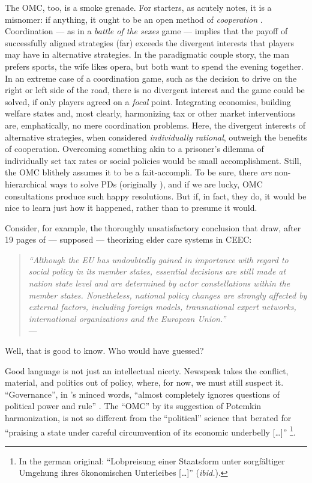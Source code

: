 \documentclass[11pt,a4paper,oneside]{article}
\begin{document}
The \gls{OMC}, too, is a smoke grenade. 
For starters, as \citeauthor{Offe2003} acutely notes, it is a misnomer: 
if anything, it ought to be an open method of \emph{cooperation} \citeyearpar[467]{Offe2003}. 
Coordination --- as in a \emph{battle of the sexes} game --- implies that the payoff of successfully aligned strategies (far) exceeds the divergent interests that players may have in alternative strategies. 
In the paradigmatic couple story, the man prefers sports, the wife likes opera, but both want to spend the evening together. 
In an extreme case of a coordination game, such as the decision to drive on the right or left side of the road, there is no divergent interest and the game could be solved, if only players agreed on a \emph{focal} point. 
Integrating economies, building welfare states and, most clearly, harmonizing tax or other market interventions are, emphatically, no mere coordination problems. 
Here, the divergent interests of alternative strategies, when considered \emph{individually rational}, outweigh the benefits of cooperation. 
Overcoming something akin to a prisoner's dilemma of individually set tax rates or social policies would be small accomplishment. 
Still, the \gls{OMC} blithely assumes it to be a fait-accompli. 
To be sure, there \emph{are} non-hierarchical ways to solve \glspl{PD} (originally \citealt{Axelrod1980}), and if we are lucky, \gls{OMC} consultations produce such happy resolutions. 
But if, in fact, they do, it would be nice to learn just how it happened, rather than to presume it would. 

Consider, for example, the thoroughly unsatisfactory conclusion that \citeauthor{Theobald2009} draw, after 19 pages of --- supposed --- theorizing elder care systems in \gls{CEEC}:
\begin{quote}
	\emph{``Although the EU has undoubtedly gained in importance with regard to social policy in its member states, essential decisions are still made at nation state level and are determined by actor constellations within the member states.
	Nonetheless, national policy changes are strongly affected by external factors, including foreign models, transnational expert networks, international organizations and the European Union.''}\\
	--- \citet[163]{Theobald2009}
\end{quote}
Well, that is good to know. 
Who would have guessed?

Good language is not just an intellectual nicety. 
Newspeak takes the conflict, material, and politics out of policy, where, for now, we must still suspect it. 
``Governance'', in \citeauthor{Jachtenfuchs2001}'s minced words, ``almost completely ignores questions of political power and rule'' \citeyearpar[258]{Jachtenfuchs2001}. 
The ``\gls{OMC}'' by its suggestion of Potemkin harmonization, is not so different from the ``political'' science that \cite{Agnoli-1989-aa} berated for ``praising a state under careful circumvention of its economic underbelly [\ldots]'' \citeyearpar[195]{Agnoli-1989-aa}
\footnote{
	In the german original: 
	``Lobpreisung einer Staatsform unter sorgf\"{a}ltiger Umgehung ihres \"{o}konomischen Unterleibes [\ldots]'' (\emph{ibid.}).
}.
\end{document}
